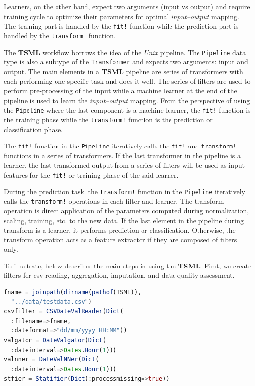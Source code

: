 \documentclass{juliacon}
\begin{document}
\vskip 6pt

Learners, on the other hand, expect two arguments (input vs output) and require training cycle to optimize their parameters for optimal \emph{input--output} mapping. The training part is handled by the \texttt{fit!} function while the prediction part is handled by the \texttt{transform!} function. 

\vskip 6pt

The \textbf{TSML} workflow borrows the idea of the  \emph{Unix} pipeline\cite{orchestra2014, combineml2016}. 
The \texttt{Pipeline} data type is also a subtype of the \texttt{Transformer} and expects two arguments: input and output. The main elements in a \textbf{TSML} pipeline are series of transformers with each performing one specific task and does it well. The series of filters are used to perform pre-processing of the input while a machine learner at the end of the pipeline is used to learn the \emph{input--output} mapping. From the perspective of using the \texttt{Pipeline} where the last component is a machine learner, the \texttt{fit!} function is the training phase while the \texttt{transform!} function is the prediction or classification phase.
\vskip 6pt

The \texttt{fit!} function in the \texttt{Pipeline} iteratively calls the \texttt{fit!} and \texttt{transform!} functions in a series of transformers. If the last transformer in the pipeline is a learner, the last transformed output from a series of filters will be used as input features for the \texttt{fit!} or training phase of the said learner.

\vskip 6pt

During the prediction task, the \texttt{transform!} function in the \texttt{Pipeline} iteratively calls the \texttt{transform!} operations in each filter and learner. The transform operation is direct application of the parameters computed during normalization, scaling, training, etc. to the new data. If the last element in the pipeline during transform is a learner, it performs prediction or classification. Otherwise, the transform operation acts as a feature extractor if they are composed of filters only.

\vskip 6pt
To illustrate, below describes the main steps in using the \textbf{TSML}.
First, we create filters for csv reading, aggregation, imputation, and data quality
assessment.

\begin{lstlisting}[language = Julia]
fname = joinpath(dirname(pathof(TSML)),
  "../data/testdata.csv")
csvfilter = CSVDateValReader(Dict(
  :filename=>fname,
  :dateformat=>"dd/mm/yyyy HH:MM"))
valgator = DateValgator(Dict(
  :dateinterval=>Dates.Hour(1)))
valnner = DateValNNer(Dict(
  :dateinterval=>Dates.Hour(1)))
stfier = Statifier(Dict(:processmissing=>true))
\end{lstlisting}
\end{document}
